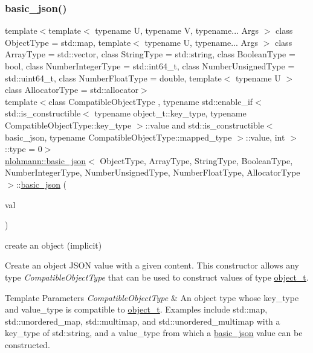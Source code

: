 \subsubsection{\texorpdfstring{basic\+\_\+json()}{basic\_json()}\hspace{0.1cm}{\footnotesize\ttfamily [4/23]}}
{\footnotesize\ttfamily template$<$template$<$ typename U, typename V, typename... Args $>$ class Object\+Type = std\+::map, template$<$ typename U, typename... Args $>$ class Array\+Type = std\+::vector, class String\+Type  = std\+::string, class Boolean\+Type  = bool, class Number\+Integer\+Type  = std\+::int64\+\_\+t, class Number\+Unsigned\+Type  = std\+::uint64\+\_\+t, class Number\+Float\+Type  = double, template$<$ typename U $>$ class Allocator\+Type = std\+::allocator$>$ \\
template$<$class Compatible\+Object\+Type , typename std\+::enable\+\_\+if$<$ std\+::is\+\_\+constructible$<$ typename object\+\_\+t\+::key\+\_\+type, typename Compatible\+Object\+Type\+::key\+\_\+type $>$\+::value and std\+::is\+\_\+constructible$<$ basic\+\_\+json, typename Compatible\+Object\+Type\+::mapped\+\_\+type $>$\+::value, int $>$\+::type  = 0$>$ \\
\hyperlink{classnlohmann_1_1basic__json}{nlohmann\+::basic\+\_\+json}$<$ Object\+Type, Array\+Type, String\+Type, Boolean\+Type, Number\+Integer\+Type, Number\+Unsigned\+Type, Number\+Float\+Type, Allocator\+Type $>$\+::\hyperlink{classnlohmann_1_1basic__json}{basic\+\_\+json} (\begin{DoxyParamCaption}\item[{const Compatible\+Object\+Type \&}]{val }\end{DoxyParamCaption})\hspace{0.3cm}{\ttfamily [inline]}}



create an object (implicit) 

Create an object J\+S\+ON value with a given content. This constructor allows any type {\itshape Compatible\+Object\+Type} that can be used to construct values of type \hyperlink{classnlohmann_1_1basic__json_a0ac9894c9de8dc551cf2e5f1c605537f}{object\+\_\+t}.


\begin{DoxyTemplParams}{Template Parameters}
{\em Compatible\+Object\+Type} & An object type whose {\ttfamily key\+\_\+type} and {\ttfamily value\+\_\+type} is compatible to \hyperlink{classnlohmann_1_1basic__json_a0ac9894c9de8dc551cf2e5f1c605537f}{object\+\_\+t}. Examples include {\ttfamily std\+::map}, {\ttfamily std\+::unordered\+\_\+map}, {\ttfamily std\+::multimap}, and {\ttfamily std\+::unordered\+\_\+multimap} with a {\ttfamily key\+\_\+type} of {\ttfamily std\+::string}, and a {\ttfamily value\+\_\+type} from which a \hyperlink{classnlohmann_1_1basic__json}{basic\+\_\+json} value can be constructed.\\
\hline
\end{DoxyTemplParams}

